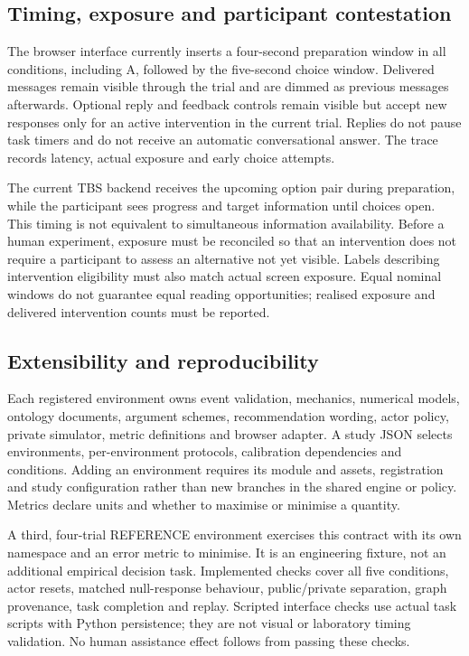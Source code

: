 \documentclass[11pt,a4paper]{article}
\begin{document}
\subsection{Timing, exposure and participant contestation}
The browser interface currently inserts a four-second preparation window in all conditions, including A, followed by the five-second choice window. Delivered messages remain visible through the trial and are dimmed as previous messages afterwards. Optional reply and feedback controls remain visible but accept new responses only for an active intervention in the current trial. Replies do not pause task timers and do not receive an automatic conversational answer. The trace records latency, actual exposure and early choice attempts.

The current TBS backend receives the upcoming option pair during preparation, while the participant sees progress and target information until choices open. This timing is not equivalent to simultaneous information availability. Before a human experiment, exposure must be reconciled so that an intervention does not require a participant to assess an alternative not yet visible. Labels describing intervention eligibility must also match actual screen exposure. Equal nominal windows do not guarantee equal reading opportunities; realised exposure and delivered intervention counts must be reported.

\subsection{Extensibility and reproducibility}
Each registered environment owns event validation, mechanics, numerical models, ontology documents, argument schemes, recommendation wording, actor policy, private simulator, metric definitions and browser adapter. A study JSON selects environments, per-environment protocols, calibration dependencies and conditions. Adding an environment requires its module and assets, registration and study configuration rather than new branches in the shared engine or policy. Metrics declare units and whether to maximise or minimise a quantity.

A third, four-trial REFERENCE environment exercises this contract with its own namespace and an error metric to minimise. It is an engineering fixture, not an additional empirical decision task. Implemented checks cover all five conditions, actor resets, matched null-response behaviour, public/private separation, graph provenance, task completion and replay. Scripted interface checks use actual task scripts with Python persistence; they are not visual or laboratory timing validation. No human assistance effect follows from passing these checks.
\end{document}
